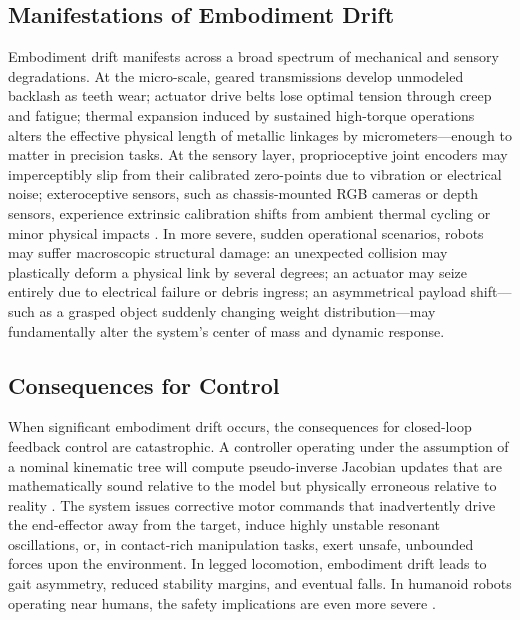 \documentclass[12pt,a4paper,oneside]{report}
\begin{document}
\subsection{Manifestations of Embodiment Drift}
\label{subsec:manifestations_embodiment_drift}

Embodiment drift manifests across a broad spectrum of mechanical and sensory degradations. At the micro-scale, geared transmissions develop unmodeled backlash as teeth wear; actuator drive belts lose optimal tension through creep and fatigue; thermal expansion induced by sustained high-torque operations alters the effective physical length of metallic linkages by micrometers---enough to matter in precision tasks. At the sensory layer, proprioceptive joint encoders may imperceptibly slip from their calibrated zero-points due to vibration or electrical noise; exteroceptive sensors, such as chassis-mounted RGB cameras or depth sensors, experience extrinsic calibration shifts from ambient thermal cycling or minor physical impacts \cite{rezvani2024robust}. In more severe, sudden operational scenarios, robots may suffer macroscopic structural damage: an unexpected collision may plastically deform a physical link by several degrees; an actuator may seize entirely due to electrical failure or debris ingress; an asymmetrical payload shift---such as a grasped object suddenly changing weight distribution---may fundamentally alter the system's center of mass and dynamic response.
\subsection{Consequences for Control}
\label{subsec:consequences_control}

When significant embodiment drift occurs, the consequences for closed-loop feedback control are catastrophic. A controller operating under the assumption of a nominal kinematic tree will compute pseudo-inverse Jacobian updates that are mathematically sound relative to the model but physically erroneous relative to reality \cite{siciliano2009robotics}. The system issues corrective motor commands that inadvertently drive the end-effector away from the target, induce highly unstable resonant oscillations, or, in contact-rich manipulation tasks, exert unsafe, unbounded forces upon the environment. In legged locomotion, embodiment drift leads to gait asymmetry, reduced stability margins, and eventual falls. In humanoid robots operating near humans, the safety implications are even more severe \cite{kwiatkowski2019task}.
\end{document}
